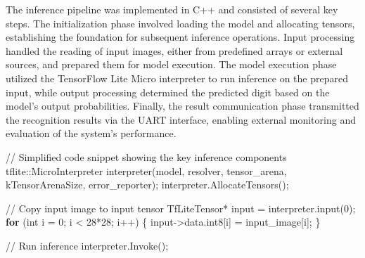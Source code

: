 \documentclass[
  9pt,
  letterpaper,
  abstract,
  titlepage]{scrbook}
\newenvironment{Shaded}{\begin{snugshade}}{\end{snugshade}}
\newcommand{\CommentTok}[1]{\textcolor[rgb]{0.37,0.37,0.37}{#1}}
\newcommand{\ControlFlowTok}[1]{\textcolor[rgb]{0.00,0.23,0.31}{\textbf{#1}}}
\newcommand{\DataTypeTok}[1]{\textcolor[rgb]{0.68,0.00,0.00}{#1}}
\newcommand{\DecValTok}[1]{\textcolor[rgb]{0.68,0.00,0.00}{#1}}
\newcommand{\NormalTok}[1]{\textcolor[rgb]{0.00,0.23,0.31}{#1}}
\newcommand{\OperatorTok}[1]{\textcolor[rgb]{0.37,0.37,0.37}{#1}}
\begin{document}
The inference pipeline was implemented in C++ and consisted of several
key steps. The initialization phase involved loading the model and
allocating tensors, establishing the foundation for subsequent inference
operations. Input processing handled the reading of input images, either
from predefined arrays or external sources, and prepared them for model
execution. The model execution phase utilized the TensorFlow Lite Micro
interpreter to run inference on the prepared input, while output
processing determined the predicted digit based on the model's output
probabilities. Finally, the result communication phase transmitted the
recognition results via the UART interface, enabling external monitoring
and evaluation of the system's performance.

\begin{Shaded}
\begin{Highlighting}[]
\CommentTok{// Simplified code snippet showing the key inference components}
\NormalTok{tflite}\OperatorTok{::}\NormalTok{MicroInterpreter interpreter}\OperatorTok{(}\NormalTok{model}\OperatorTok{,}\NormalTok{ resolver}\OperatorTok{,}\NormalTok{ tensor\_arena}\OperatorTok{,}
\NormalTok{                                   kTensorArenaSize}\OperatorTok{,}\NormalTok{ error\_reporter}\OperatorTok{);}
\NormalTok{interpreter}\OperatorTok{.}\NormalTok{AllocateTensors}\OperatorTok{();}

\CommentTok{// Copy input image to input tensor}
\NormalTok{TfLiteTensor}\OperatorTok{*}\NormalTok{ input }\OperatorTok{=}\NormalTok{ interpreter}\OperatorTok{.}\NormalTok{input}\OperatorTok{(}\DecValTok{0}\OperatorTok{);}
\ControlFlowTok{for} \OperatorTok{(}\DataTypeTok{int}\NormalTok{ i }\OperatorTok{=} \DecValTok{0}\OperatorTok{;}\NormalTok{ i }\OperatorTok{\textless{}} \DecValTok{28}\OperatorTok{*}\DecValTok{28}\OperatorTok{;}\NormalTok{ i}\OperatorTok{++)} \OperatorTok{\{}
\NormalTok{    input}\OperatorTok{{-}\textgreater{}}\NormalTok{data}\OperatorTok{.}\NormalTok{int8}\OperatorTok{[}\NormalTok{i}\OperatorTok{]} \OperatorTok{=}\NormalTok{ input\_image}\OperatorTok{[}\NormalTok{i}\OperatorTok{];}
\OperatorTok{\}}

\CommentTok{// Run inference}
\NormalTok{interpreter}\OperatorTok{.}\NormalTok{Invoke}\OperatorTok{();}


\end{Highlighting}
\end{Shaded}
\end{document}

